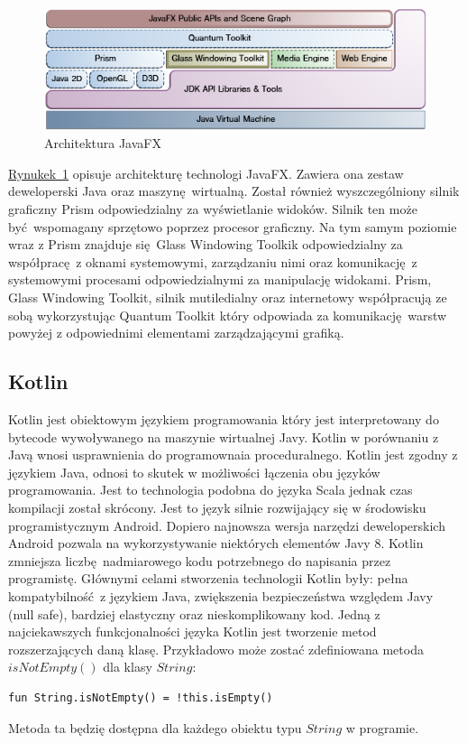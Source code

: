   \begin{figure}[h]
    \center
    \includegraphics[scale=0.6]{../image/fx_arch.png}
    \caption{Architektura JavaFX}
    \label{fig:fx_arch}
  \end{figure}

\hyperref[fig:java_arch]{Rynukek~\ref*{fig:fx_arch}} opisuje architekturę technologi JavaFX. Zawiera ona zestaw deweloperski Java oraz maszynę wirtualną. Został również wyszczególniony silnik graficzny Prism odpowiedzialny za wyświetlanie widoków. Silnik ten może być wspomagany sprzętowo poprzez procesor graficzny. Na tym samym poziomie wraz z Prism znajduje się Glass Windowing Toolkik odpowiedzialny za współpracę z oknami systemowymi, zarządzaniu nimi oraz komunikację z systemowymi procesami odpowiedzialnymi za manipulację widokami. Prism, Glass Windowing Toolkit, silnik mutiledialny oraz internetowy współpracują ze sobą wykorzystując Quantum Toolkit który odpowiada za komunikację warstw powyżej z odpowiednimi elementami zarządzającymi grafiką.

\subsection{Kotlin}
Kotlin jest obiektowym językiem programowania który jest interpretowany do bytecode wywoływanego na maszynie wirtualnej Javy. Kotlin w porównaniu z Javą wnosi usprawnienia do programownaia proceduralnego. Kotlin jest zgodny z językiem Java, odnosi to skutek w możliwości łączenia obu języków programowania. Jest to technologia podobna do języka Scala jednak czas kompilacji został skrócony. Jest to język silnie rozwijający się w środowisku programistycznym Android. Dopiero najnowsza wersja narzędzi deweloperskich Android pozwala na wykorzystywanie niektórych elementów Javy 8. Kotlin zmniejsza liczbę nadmiarowego kodu potrzebnego do napisania przez programistę. Głównymi celami stworzenia technologii Kotlin były: pełna kompatybilność z językiem Java, zwiększenia bezpieczeństwa względem Javy (null safe), bardziej elastyczny oraz nieskomplikowany kod. Jedną z najciekawszych funkcjonalności języka Kotlin jest tworzenie metod rozszerzających daną klasę. Przykładowo może zostać zdefiniowana metoda $isNotEmpty()$ dla klasy $String$:
\lstset{language=Java}
\begin{lstlisting}[frame=single]
  fun String.isNotEmpty() = !this.isEmpty()
\end{lstlisting}
Metoda ta będzię dostępna dla każdego obiektu typu $String$ w programie.
